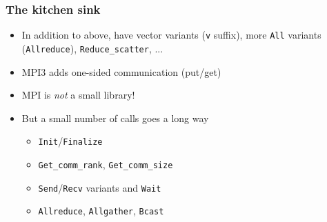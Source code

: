 \documentclass{beamer}
\begin{document}
\begin{frame}
  \frametitle{The kitchen sink}

  \begin{itemize}
  \item In addition to above, have vector variants ({\tt v} suffix),
    more {\tt All} variants ({\tt Allreduce}), {\tt Reduce\_scatter}, ...
  \item MPI3 adds one-sided communication (put/get)
  \item MPI is {\em not} a small library!
  \item But a small number of calls goes a long way
    \begin{itemize}
    \item {\tt Init}/{\tt Finalize}
    \item {\tt Get\_comm\_rank}, {\tt Get\_comm\_size}
    \item {\tt Send}/{\tt Recv} variants and {\tt Wait}
    \item {\tt Allreduce}, {\tt Allgather}, {\tt Bcast}
    \end{itemize}
  \end{itemize}
\end{frame}
\end{document}
